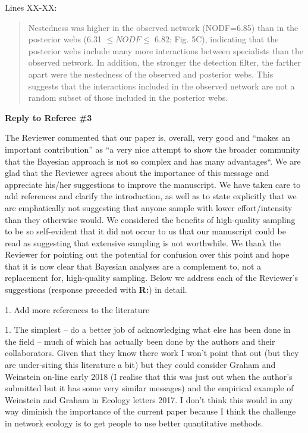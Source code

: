 \documentclass[12pt]{letter}
\newenvironment{refquote}{\bigskip \begin{it}}{\end{it}\smallskip}
\begin{document}
		Lines XX-XX:


		\begin{quotation}
			Nestedness was higher in the observed network (NODF=6.85) than in the posterior webs (6.31 $\leq NODF \leq$ 6.82; Fig. 5C), indicating that the posterior webs include many more interactions between specialists than the observed network. In addition, the stronger the detection filter, the farther apart were the nestedness of the observed and posterior webs. This suggests that the interactions included in the observed network are not a random subset of those included in the posterior webs.
		\end{quotation}

\clearpage

{\Large \bf Reply to Referee \#3}

	The Reviewer commented that our paper is, overall, very good and ``makes an important contribution'' as ``a very nice attempt to show the broader community that the Bayesian approach is not so complex and has many advantages``. We are glad that the Reviewer agrees about the importance of this message and appreciate his/her suggestions to improve the manuscript. We have taken care to add references and clarify the introduction, as well as to state explicitly that we are emphatically not suggesting that anyone sample with lower effort/intensity than they otherwise would. We considered the benefits of high-quality sampling to be so self-evident that it did not occur to us that our manuscript could be read as suggesting that extensive sampling is not worthwhile. We thank the Reviewer for pointing out the potential for confusion over this point and hope that it is now clear that Bayesian analyses are a complement to, not a replacement for, high-quality sampling. Below we address each of the Reviewer's suggestions (response preceded with \textbf{R:}) in detail.


	1. Add more references to the literature


		\begin{refquote}
		1.      The simplest – do a better job of acknowledging what else has been done in the field – much of which has actually been done by the authors and their collaborators.  Given that they know there work I won't point that out (but they are under-siting this literature a bit) but they could consider Graham and Weinstein on-line early 2018 (I realise that this was just out when the author's submitted but it has some very similar messages) and the empirical example of Weinstein and Graham in Ecology letters 2017.  I don't think this would in any way diminish the importance of the current paper because I think the challenge in network ecology is to get people to use better quantitative methods.
		\end{refquote}
\end{document}
